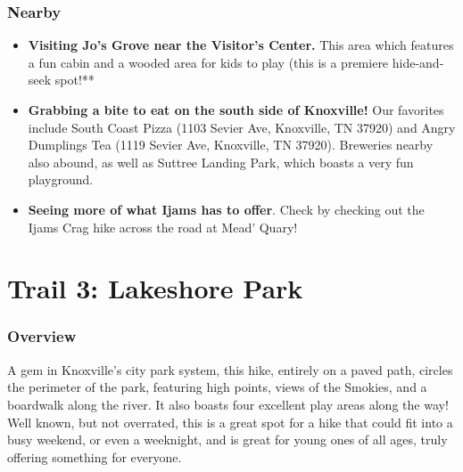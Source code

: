 \documentclass[
  letterpaper,
  DIV=11,
  numbers=noendperiod]{scrreprt}
\providecommand{\tightlist}{%
  \setlength{\itemsep}{0pt}\setlength{\parskip}{0pt}}\usepackage{longtable,booktabs,array}
\begin{document}
\subsection{Nearby}\label{nearby-1}

\begin{itemize}
\tightlist
\item
  \textbf{Visiting Jo's Grove near the Visitor's Center.} This area
  which features a fun cabin and a wooded area for kids to play (this is
  a premiere hide-and-seek spot!**
\item
  \textbf{Grabbing a bite to eat on the south side of Knoxville!} Our
  favorites include South Coast Pizza (1103 Sevier Ave, Knoxville, TN
  37920) and Angry Dumplings Tea (1119 Sevier Ave, Knoxville, TN 37920).
  Breweries nearby also abound, as well as Suttree Landing Park, which
  boasts a very fun playground.
\item
  \textbf{Seeing more of what Ijams has to offer}. Check by checking out
  the Ijams Crag hike across the road at Mead' Quary!
\end{itemize}

\chapter{Trail 3: Lakeshore Park}\label{trail-3-lakeshore-park}

\subsection{Overview}\label{overview-3}

A gem in Knoxville's city park system, this hike, entirely on a paved
path, circles the perimeter of the park, featuring high points, views of
the Smokies, and a boardwalk along the river. It also boasts four
excellent play areas along the way! Well known, but not overrated, this
is a great spot for a hike that could fit into a busy weekend, or even a
weeknight, and is great for young ones of all ages, truly offering
something for everyone.
\end{document}
